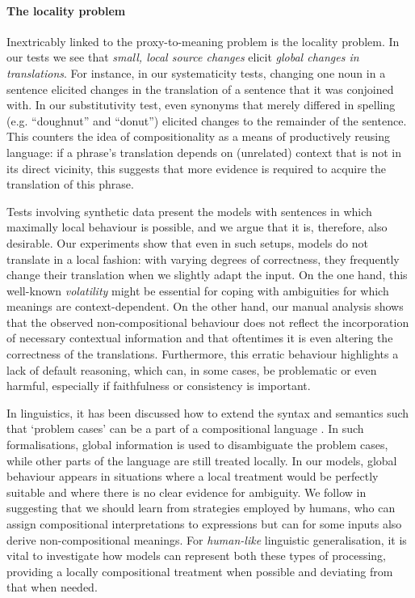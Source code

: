 \paragraph{The locality problem}
Inextricably linked to the proxy-to-meaning problem is the locality problem.
In our tests we see that \emph{small, local source changes} elicit \emph{global changes in translations}.
For instance, in our systematicity tests, changing one noun in a sentence elicited changes in the translation of a sentence that it was conjoined with.
In our substitutivity test, even synonyms that merely differed in spelling (e.g. ``doughnut'' and ``donut'') elicited changes to the remainder of the sentence.
This counters the idea of compositionality as a means of productively reusing language: if a phrase's translation depends on (unrelated) context that is not in its direct vicinity, this suggests that more evidence is required to acquire the translation of this phrase.

Tests involving synthetic data present the models with sentences in which maximally local behaviour is possible, and we argue that it is, therefore, also desirable.
Our experiments show that even in such setups, models do not translate in a local fashion: with varying degrees of correctness, they frequently change their translation when we slightly adapt the input.
On the one hand, this well-known \emph{volatility} \citep[see also][]{fadaee2020unreasonable} might be essential for coping with ambiguities for which meanings are context-dependent.
On the other hand, our manual analysis shows that the observed non-compositional behaviour does not reflect the incorporation of necessary contextual information and that oftentimes it is even altering the correctness of the translations.
Furthermore, this erratic behaviour highlights a lack of default reasoning, which can, in some cases, be problematic or even harmful, especially if faithfulness \citep{parthasarathi2021sometimes} or consistency is important.

In linguistics, it has been discussed how to extend the syntax and semantics such that `problem cases’ can be a part of a compositional language \citep{westerstaahl2002compositionality,pagin2010compositionality}.
In such formalisations, global information is used to disambiguate the problem cases, while other parts of the language are still treated locally.
In our models, global behaviour appears in situations where a local treatment would be perfectly suitable and where there is no clear evidence for ambiguity.
We follow \citet{baggio2021compositionality} in suggesting that we should learn from strategies employed by humans, who can assign compositional interpretations to expressions but can for some inputs also derive non-compositional meanings.
For \textit{human-like} linguistic generalisation, it is vital to investigate how models can represent both these types of processing, providing a locally compositional treatment when possible and deviating from that when needed.

